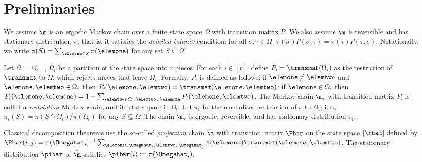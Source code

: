 \documentclass[11pt]{article}
\providecommand{\ie}{i.\,e.}
\begin{document}
\section{Preliminaries}\label{sec:prelim}



We assume $\m$ is an ergodic Markov chain over a finite state space 
$\Omega$ with transition matrix $P$. We also assume $\m$ is reversible 
and has stationary distribution $\pi$; that is, it 
satisfies the \emph{detailed balance} condition: for all 
$\sigma,\tau\in\Omega$, 
$\pi(\sigma)P(\sigma,\tau)=\pi(\tau)P(\tau,\sigma)$.  Notationally, 
we write $\pi(S) = \sum_{\elemone\in S} \pi(\elemone)$ for any set 
$S\subseteq \Omega$.

Let $\Omega = \cup_{i=1}^{r} \Omega_i$ be a partition of the state 
space into $r$ pieces.  For each $i \in [r]$, define $P_{i} = 
\transmat(\Omega_i)$ as the restriction of $\transmat$ to $\Omega_i$ 
which rejects moves that leave $\Omega_i$.  
Formally, $P_{i}$ is defined as 
follows: if $\elemone \not= \elemtwo$ and $\elemone,\elemtwo \in 
\Omega_i$ then $P_i(\elemone,\elemtwo)=\transmat(\elemone,\elemtwo)$; 
if $\elemone \in \Omega_i$ then 
$P_i(\elemone,\elemone)=1-\sum_{\elemtwo \in \Omega_i, \elemtwo \not= 
  \elemone} P_i(\elemone,\elemtwo)$.  The Markov chain $\m_i$ with transition matrix $P_i$ is called a \emph{restriction} Markov chain, and its state space is $\Omega_i$.
Let $\pi_i$ be the normalized restriction of 
$\pi$ to $\Omega_i$; \ie,  $\pi_i(S)=\pi(S\cap\Omega_i)/\pi(\Omega_i)$ 
for any $S \subseteq \Omega$.  The chain $\m_i$ is ergodic, 
reversible, and has stationary distribution $\pi_i$.

Classical decomposition theorems use the so-called \emph{projection} chain $\bar{\m}$
with transition matrix $\Pbar$ on the state space $[\rhat]$ defined by 
$\Pbar(i,j)=\pi(\Omegahat_i)^{-1}\sum_{{\elemone\in\Omegahat_i,}{\elemtwo
\in \Omegahat_j}} \pi(\elemone)\transmat(\elemone,\elemtwo)$.
The stationary distribution $\pibar$ of $\bar{\m}$ satisfies $\pibar(i) := 
\pi(\Omegahat_i)$. 
\end{document}
